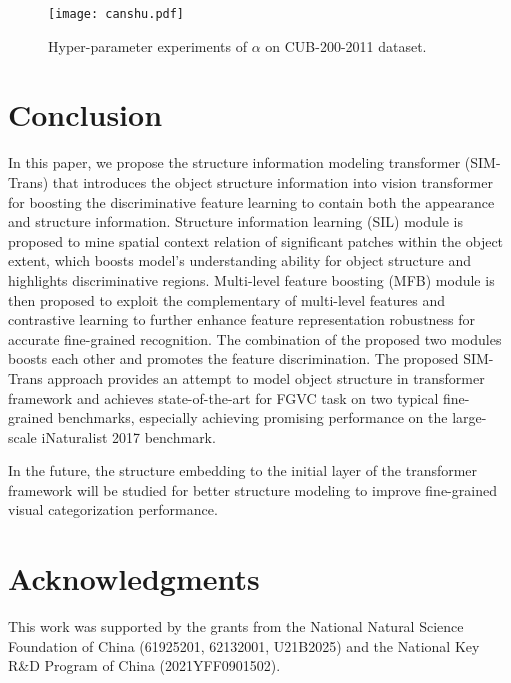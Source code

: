 \documentclass[sigconf, nonacm]{acmart}
\begin{document}
\begin{figure}[t]
  \centering
  \texttt{[image: canshu.pdf]}
  \caption{Hyper-parameter experiments of $\alpha $ on CUB-200-2011 dataset.}
  \label{canshu}
\end{figure}

















\section{Conclusion}
In this paper, we propose the structure information modeling transformer (SIM-Trans) that introduces the object structure information into vision transformer for boosting the discriminative feature learning to contain both the appearance and structure information. Structure information learning (SIL) module is proposed to mine spatial context relation of significant patches within the object extent, which boosts model’s understanding ability for object structure and highlights discriminative regions. Multi-level feature boosting (MFB) module is then proposed to exploit the complementary of multi-level features and contrastive learning to further enhance feature representation robustness for accurate fine-grained recognition. The combination of the proposed two modules boosts each other and promotes the feature discrimination. The proposed SIM-Trans approach provides an attempt to model object structure in transformer framework and achieves state-of-the-art for FGVC task on two typical fine-grained benchmarks, especially achieving promising performance on the large-scale iNaturalist 2017 benchmark.

In the future, the structure embedding to the initial layer of the transformer framework will be studied for better structure modeling to improve fine-grained visual categorization performance.

\section{Acknowledgments}
This work was supported by the grants from the National Natural Science Foundation of China (61925201, 62132001, U21B2025) and the National Key R\&D Program of China (2021YFF0901502).








\newpage
\balance








\end{document}
